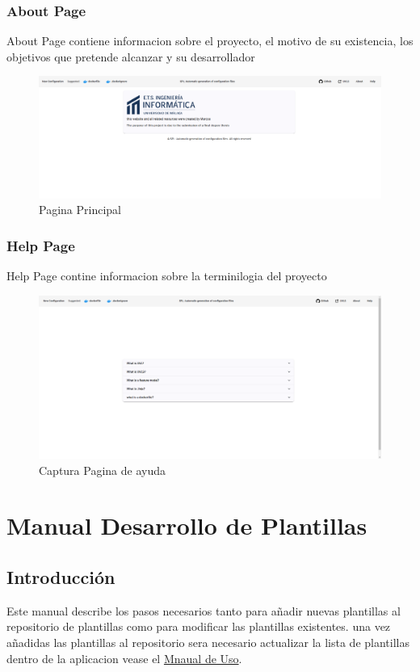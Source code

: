\documentclass[12pt, a4paper, twoside]{article}
\begin{document}
\begin{umaappendices}
	\subsubsection{About Page}
	About Page contiene informacion sobre el proyecto, el motivo de su existencia, los objetivos que pretende alcanzar y su desarrollador
	\begin{figure}[h]
		\centering
			\includegraphics[width=1\textwidth]{Aboutpage.png}
		\caption{Pagina Principal}
	\end{figure}

	\subsubsection{Help Page}
	Help Page contine informacion sobre la terminilogia del proyecto 
	\begin{figure}[h]
		\centering
			\includegraphics[width=1\textwidth]{HelpPage.png}
		\caption{Captura Pagina de ayuda}
	\end{figure}




	\section{Manual Desarrollo de Plantillas}
	\label{sec:Manual de Desarrollo}
	\subsection{Introducción}
	Este manual describe los pasos necesarios tanto para añadir nuevas plantillas al repositorio de plantillas \cite{m4rdom_templates} como para modificar las plantillas existentes.
	una vez añadidas las plantillas al repositorio sera necesario actualizar la lista de plantillas dentro de la aplicacion vease el \hyperref[sec:Actualizar Plantillas]{Mnaual de Uso}.

\end{umaappendices}
\end{document}
